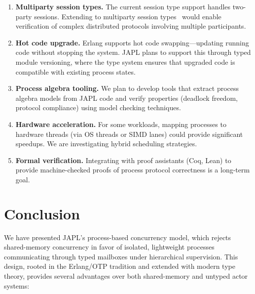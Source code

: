 \documentclass[11pt,a4paper]{article}
\begin{document}
\begin{enumerate}
\item \textbf{Multiparty session types.} The current session type support handles two-party sessions. Extending to multiparty session types~\citep{honda2008multiparty} would enable verification of complex distributed protocols involving multiple participants.

\item \textbf{Hot code upgrade.} Erlang supports hot code swapping---updating running code without stopping the system. JAPL plans to support this through typed module versioning, where the type system ensures that upgraded code is compatible with existing process states.

\item \textbf{Process algebra tooling.} We plan to develop tools that extract process algebra models from JAPL code and verify properties (deadlock freedom, protocol compliance) using model checking techniques.

\item \textbf{Hardware acceleration.} For some workloads, mapping processes to hardware threads (via OS threads or SIMD lanes) could provide significant speedups. We are investigating hybrid scheduling strategies.

\item \textbf{Formal verification.} Integrating with proof assistants (Coq, Lean) to provide machine-checked proofs of process protocol correctness is a long-term goal.
\end{enumerate}


\section{Conclusion}\label{sec:conclusion}

We have presented JAPL's process-based concurrency model, which rejects shared-memory concurrency in favor of isolated, lightweight processes communicating through typed mailboxes under hierarchical supervision. This design, rooted in the Erlang/OTP tradition and extended with modern type theory, provides several advantages over both shared-memory and untyped actor systems:
\end{document}
